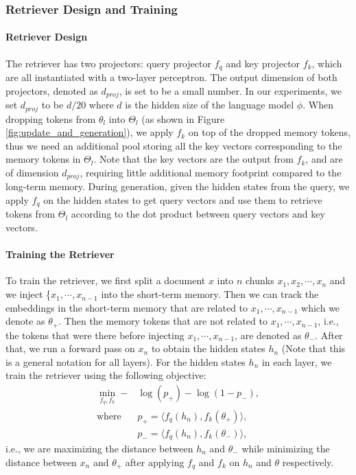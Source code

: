 \vspace{-5pt}
\subsubsection{Retriever Design and Training}
\vspace{-5pt}
\paragraph{Retriever Design}
The retriever has two projectors: query projector $f_q$ and key projector $f_k$, which are all instantiated with a two-layer perceptron. The output dimension of both projectors, denoted as $d_{proj}$, is set to be a small number. In our experiments, we set $d_{proj}$ to be $d/20$ where $d$ is the hidden size of the language model $\phi$. When dropping tokens from $\theta_l$ into $\Theta_l$ (as shown in Figure \ref{fig:update_and_generation}), we apply $f_k$ on top of the dropped memory tokens, thus we need an additional pool storing all the key vectors corresponding to the memory tokens in $\Theta_l$. Note that the key vectors are the output from $f_k$, and are of dimension $d_{proj}$, requiring little additional memory footprint compared to the long-term memory.
During generation, given the hidden states from the query, we apply $f_q$ on the hidden states to get query vectors and use them to retrieve tokens from $\Theta_l$ according to the dot product between query vectors and key vectors. 

\vspace{-10pt}
\paragraph{Training the Retriever}
To train the retriever, we first split a document $x$ into $n$ chunks $x_1, x_2,\cdots, x_n$ and we inject \{$x_1, \cdots, x_{n-1}$ into the short-term memory. Then we can track the embeddings in the short-term memory that are related to $x_1,\cdots,x_{n-1}$ which we denote as $\theta_+$. Then the memory tokens that are not related to $x_1, \cdots, x_{n-1}$, i.e., the tokens that were there before injecting $x_1,\cdots,x_{n-1}$, are denoted as $\theta_-$. 
After that, we run a forward pass on $x_n$ to obtain the hidden states $h_n$ (Note that this is a general notation for all layers). For the hidden states $h_n$ in each layer, we train the retriever using the following objective:
\begin{align*}
    \min_{f_q, f_k} - & \log (p_+) - \log (1 - p_-), \\
    \textrm{where } & p_+ = \langle f_q(h_n), f_k(\theta_+) \rangle, \\
    &    p_- = \langle f_q(h_n), f_k(\theta_-) \rangle,
\end{align*}
i.e., we are maximizing the distance between $h_n$ and $\theta_-$ while minimizing the distance between $x_n$ and $\theta_+$ after applying $f_q$ and $f_k$ on $h_n$ and $\theta$ respectively. 


